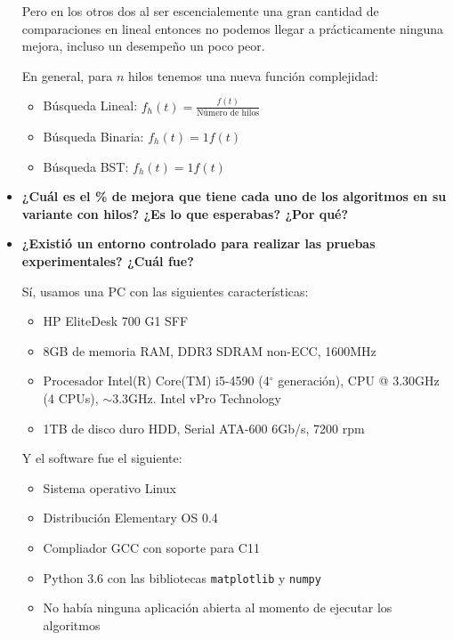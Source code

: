 \documentclass[12pt, fleqn]{article}                             %
\theoremstyle{break}                                            %
\begin{document}
\begin{itemize}
                Pero en los otros dos al ser escencialemente una gran cantidad de comparaciones en lineal
                entonces no podemos llegar a prácticamente ninguna mejora, incluso un desempeño un poco peor.

                En general, para $n$ hilos tenemos una nueva función complejidad:
                \begin{itemize}
                    \item Búsqueda Lineal: $f_h(t) = \frac{f(t)}{\text{Número de hilos}}$
                    \item Búsqueda Binaria: $f_h(t) = 1 f(t)$
                    \item Búsqueda BST: $f_h(t) = 1 f(t)$
                \end{itemize}
                
            \item
                \textbf{¿Cuál es el \% de mejora que tiene cada uno de los algoritmos en su
                variante con hilos? ¿Es lo que esperabas? ¿Por qué?}

            \clearpage

            \item
                \textbf{¿Existió un entorno controlado para realizar las pruebas experimentales?
                ¿Cuál fue?}

                Sí, usamos una PC con las siguientes características:
                \begin{itemize}\setlength\itemsep{0em}
                    \item HP EliteDesk 700 G1 SFF
                    \item 8GB de memoria RAM, DDR3 SDRAM non-ECC, 1600MHz
                    \item Procesador Intel(R) Core(TM) i5-4590 (4$^\circ$ generación), CPU @ 3.30GHz 
                        (4 CPUs), $\sim$3.3GHz. Intel vPro Technology
                    \item 1TB de disco duro HDD, Serial ATA-600 6Gb/s, 7200 rpm
                \end{itemize}
                
                Y el software fue el siguiente:
                \begin{itemize}\setlength\itemsep{0em}
                    \item Sistema operativo Linux
                    \item Distribución Elementary OS 0.4
                    \item Compliador GCC con soporte para C11
                    \item Python 3.6 con las bibliotecas \texttt{matplotlib} y \texttt{numpy}
                    \item No había ninguna aplicación abierta al momento de ejecutar los algoritmos
                \end{itemize}


\end{itemize}
\end{document}
